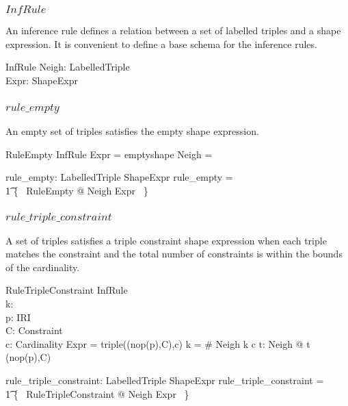 \documentclass{article}
\begin{document}
\subsubsection{$InfRule$}
An inference rule defines a relation between a set of labelled triples and a shape expression.
It is convenient to define a base schema for the inference rules.
\begin{schema}{InfRule}
	Neigh: \finset LabelledTriple \\
	Expr: ShapeExpr
\end{schema}

\subsubsection{$rule\_empty$}
An empty set of triples satisfies the empty shape expression.
\begin{schema}{RuleEmpty}
	InfRule
\where
	Expr = emptyshape
\also
	Neigh = \emptyset
\end{schema}

\begin{axdef}
	rule\_empty: \finset LabelledTriple \rel ShapeExpr
\where
	rule\_empty = \\ 
\t1		\{~ RuleEmpty @ Neigh \mapsto Expr ~\}
\end{axdef}

\subsubsection{$rule\_triple\_constraint$}
A set of triples satisfies a triple constraint shape expression when each triple matches the constraint
and the total number of constraints is within the bounds of the cardinality.
\begin{schema}{RuleTripleConstraint}
	InfRule \\
	k: \nat \\
	p: IRI \\
	C: Constraint \\
	c: Cardinality
\where
	Expr = triple((nop(p),C),c)
\also
	k = \# Neigh
\also
	k  c
\also
	\forall t: Neigh @ t  (nop(p),C)
\end{schema}

\begin{axdef}
	rule\_triple\_constraint: \finset LabelledTriple \rel ShapeExpr
\where
	rule\_triple\_constraint = \\
\t1		\{~ RuleTripleConstraint @ Neigh \mapsto Expr ~\}
\end{axdef}
\end{document}
